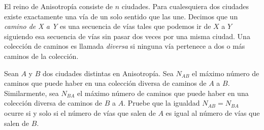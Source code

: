 \begin{probMB}
	El reino de Anisotropía consiste de $n$ ciudades. Para cualesquiera dos ciudades existe exactamente una vía de un solo sentido que las une. Decimos que un \emph{camino de X a Y} es una secuencia de vías tales que podemos ir de $X$ a $Y$ siguiendo esa secuencia de vías sin pasar dos veces por una misma ciudad. Una colección de caminos es llamada \emph{diversa} si ninguna vía pertenece a dos o más caminos de la colección.

	Sean $A$ y $B$ dos ciudades distintas en Anisotropía. Sea $N_{AB}$ el máximo número de caminos que puede haber en una colección diversa de caminos de $A$ a $B$. Similarmente, sea $N_{BA}$ el máximo número de caminos que puede haber en una colección diversa de caminos de $B$ a $A$. Pruebe que la igualdad $N_{AB}=N_{BA}$ ocurre si y solo si el número de vías que salen de $A$ es igual al número de vías que salen de $B$.
\end{probMB}

